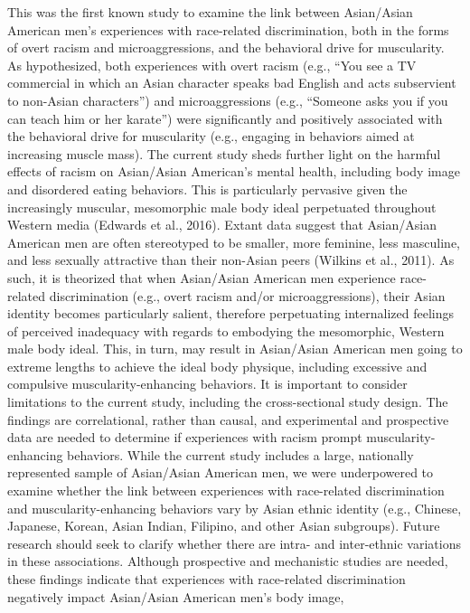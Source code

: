 \documentclass[
  12pt,
]{article}
\begin{document}
This was the first known study to examine the link between Asian/Asian
American men's experiences with race-related discrimination, both in the
forms of overt racism and microaggressions, and the behavioral drive for
muscularity. As hypothesized, both experiences with overt racism (e.g.,
``You see a TV commercial in which an Asian character speaks bad English
and acts subservient to non-Asian characters'') and microaggressions
(e.g., ``Someone asks you if you can teach him or her karate'') were
significantly and positively associated with the behavioral drive for
muscularity (e.g., engaging in behaviors aimed at increasing muscle
mass). The current study sheds further light on the harmful effects of
racism on Asian/Asian American's mental health, including body image and
disordered eating behaviors. This is particularly pervasive given the
increasingly muscular, mesomorphic male body ideal perpetuated
throughout Western media (Edwards et al., 2016). Extant data suggest
that Asian/Asian American men are often stereotyped to be smaller, more
feminine, less masculine, and less sexually attractive than their
non-Asian peers (Wilkins et al., 2011). As such, it is theorized that
when Asian/Asian American men experience race-related discrimination
(e.g., overt racism and/or microaggressions), their Asian identity
becomes particularly salient, therefore perpetuating internalized
feelings of perceived inadequacy with regards to embodying the
mesomorphic, Western male body ideal. This, in turn, may result in
Asian/Asian American men going to extreme lengths to achieve the ideal
body physique, including excessive and compulsive muscularity-enhancing
behaviors. It is important to consider limitations to the current study,
including the cross-sectional study design. The findings are
correlational, rather than causal, and experimental and prospective data
are needed to determine if experiences with racism prompt
muscularity-enhancing behaviors. While the current study includes a
large, nationally represented sample of Asian/Asian American men, we
were underpowered to examine whether the link between experiences with
race-related discrimination and muscularity-enhancing behaviors vary by
Asian ethnic identity (e.g., Chinese, Japanese, Korean, Asian Indian,
Filipino, and other Asian subgroups). Future research should seek to
clarify whether there are intra- and inter-ethnic variations in these
associations. Although prospective and mechanistic studies are needed,
these findings indicate that experiences with race-related
discrimination negatively impact Asian/Asian American men's body image,
\end{document}
